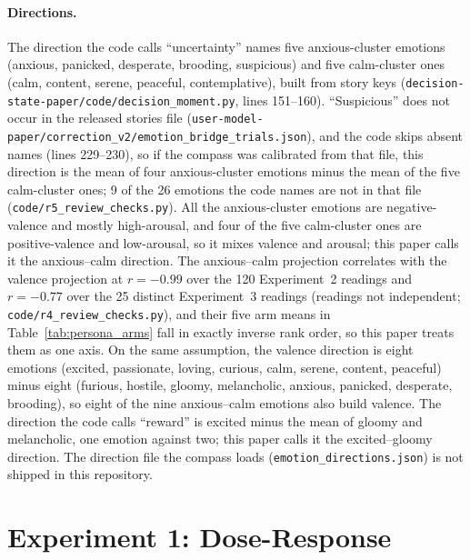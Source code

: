 \documentclass[11pt,a4paper]{article}
\begin{document}
\paragraph{Directions.} The direction the code calls ``uncertainty''
names five anxious-cluster emotions (anxious, panicked, desperate,
brooding, suspicious) and five calm-cluster ones (calm, content, serene,
peaceful, contemplative), built from story keys
(\texttt{decision-state-paper/\allowbreak code/\allowbreak decision\_moment.py}, lines
151--160). ``Suspicious'' does not occur in the released stories file
(\texttt{user-model-paper/\allowbreak correction\_v2/\allowbreak emotion\_bridge\_trials.json}),
and the code skips absent names (lines 229--230), so if the compass was
calibrated from that file, this direction is the mean of four
anxious-cluster emotions minus the mean of the five calm-cluster ones;
9 of the 26 emotions the code names are not in that file
(\texttt{code/r5\_review\_checks.py}). All the anxious-cluster emotions
are negative-valence and mostly high-arousal, and four of the five
calm-cluster ones are positive-valence and low-arousal, so it mixes
valence and arousal; this paper calls it the anxious--calm direction.
The anxious--calm projection correlates with the valence projection at
$r{=}-0.99$ over the 120 Experiment~2 readings and $r{=}-0.77$ over the
25 distinct Experiment~3 readings (readings not independent;
\texttt{code/r4\_review\_checks.py}), and their five arm means in
Table~\ref{tab:persona_arms} fall in exactly inverse rank order, so this
paper treats them as one axis. On the same assumption, the valence
direction is eight emotions (excited, passionate, loving, curious, calm,
serene, content, peaceful) minus eight (furious, hostile, gloomy,
melancholic, anxious, panicked, desperate, brooding), so eight of the
nine anxious--calm emotions also build valence. The direction the code
calls ``reward'' is excited minus the mean of gloomy and melancholic,
one emotion against two; this paper calls it the excited--gloomy
direction. The direction file the compass loads
(\texttt{emotion\_directions.json}) is not shipped in this repository.

\section{Experiment 1: Dose-Response}
\label{sec:dose}
\end{document}

